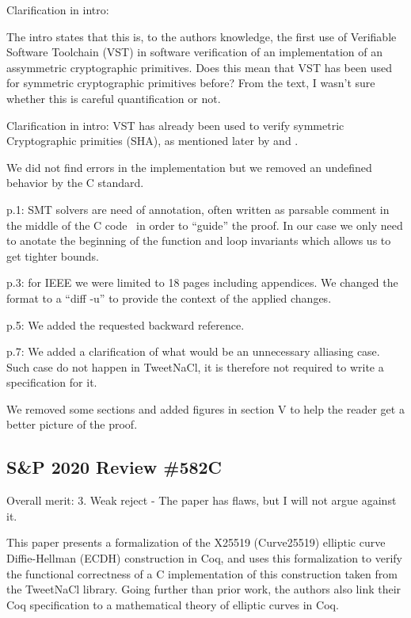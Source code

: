 Clarification in intro:

The intro states that this is, to the authors knowledge, the first use of
Verifiable Software Toolchain (VST) in software verification of an implementation
of an assymmetric cryptographic primitives. Does this mean that VST has been
used for symmetric cryptographic primitives before? From the text, I wasn't sure
whether this is careful quantification or not.


Clarification in intro: VST has already been used to verify symmetric Cryptographic
primities (\eg SHA), as mentioned later by \cite{Beringer2015VerifiedCA}
and \cite{2015-Appel}.

We did not find errors in the implementation but we removed an undefined
behavior by the C standard.

p.1: SMT solvers are need of annotation, often written as parsable comment
in the middle of the C code~\cite{acsl} in order to ``guide'' the proof.
In our case we only need to anotate the beginning of the function and loop
invariants which allows us to get tighter bounds.

p.3: for IEEE we were limited to 18 pages including appendices.
We changed the format to a ``diff -u'' to provide the context of the applied changes.

p.5: We added the requested backward reference.

p.7: We added a clarification of what would be an unnecessary alliasing case.
Such case do not happen in TweetNaCl, it is therefore not required to write a
specification for it.

We removed some sections and added figures in section V to help the reader get a
better picture of the proof.


\subsection{S\&P 2020 Review \#582C}

Overall merit: 3. Weak reject - The paper has flaws, but I will not argue against it.


\begin{center}
\end{center}

This paper presents a formalization of the X25519 (Curve25519) elliptic curve
Diffie-Hellman  (ECDH) construction in Coq, and uses this formalization to
verify the functional correctness of a C implementation of this construction
taken from the TweetNaCl library. Going further than prior work, the authors
also link their Coq specification to a mathematical theory of elliptic curves
in Coq.


